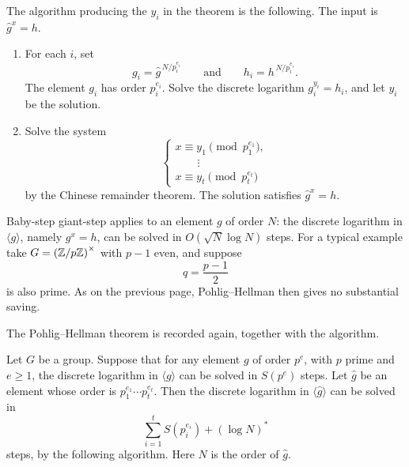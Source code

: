 The algorithm producing the \(y_i\) in the theorem is the following.
The input is \(\hat g^{x}=h\).
\begin{enumerate}[leftmargin=1.6em]
    \item For each \(i\), set
    \[
        g_i = \hat g^{\,N/p_i^{e_i}}
        \qquad\text{and}\qquad
        h_i = h^{\,N/p_i^{e_i}}.
    \]
    The element \(g_i\) has order \(p_i^{e_i}\). Solve the discrete
    logarithm \(g_i^{y_i}=h_i\), and let \(y_i\) be the solution.
    \item Solve the system
    \[
        \begin{cases}
            x\equiv y_1\pmod{p_1^{e_1}},\\
            \qquad\vdots\\
            x\equiv y_t\pmod{p_t^{e_t}}
        \end{cases}
    \]
    by the Chinese remainder theorem. The solution satisfies
    \(\hat g^{x}=h\).
\end{enumerate}



Baby-step giant-step applies to an element \(g\) of order \(N\): the
discrete logarithm in \(\langle g\rangle\), namely \(g^x=h\), can be
solved in \(O(\sqrt{N}\log N)\) steps. For a typical example take
\(G=\left(\mathbb Z/p\mathbb Z\right)^\times\) with \(p-1\) even, and suppose
\[
    q=\frac{p-1}{2}
\]
is also prime. As on the previous page, Pohlig--Hellman then gives no
substantial saving.

The Pohlig--Hellman theorem is recorded again, together with the
algorithm.

\begin{theorem}
Let \(G\) be a group. Suppose that for any element \(g\) of order
\(p^e\), with \(p\) prime and \(e\ge 1\), the discrete logarithm in
\(\langle g\rangle\) can be solved in \(S(p^e)\) steps. Let \(\hat g\)
be an element whose order is \(p_1^{e_1}\cdots p_t^{e_t}\). Then the
discrete logarithm in \(\langle\hat g\rangle\) can be solved in
\[
    \sum_{i=1}^{t} S(p_i^{e_i}) + (\log N)^{*}
\]
steps, by the following algorithm. Here \(N\) is the order of \(\hat g\).
\end{theorem}


